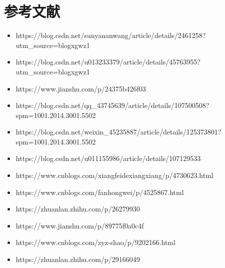 \documentclass[12pt, a4paper]{article}
\begin{document}
\section*{参考文献}
\begin{itemize}
    \item https://blog.csdn.net/sunyananwang/article/details/2461258?utm_source=blogxgwz1
    \item https://blog.csdn.net/u013233379/article/details/45763955?utm_source=blogxgwz1
    \item https://www.jianshu.com/p/24375b426f03
    \item https://blog.csdn.net/qq_43745639/article/details/107500508?spm=1001.2014.3001.5502
    \item https://blog.csdn.net/weixin_45235887/article/details/125373801?spm=1001.2014.3001.5502
    \item https://blog.csdn.net/u011155986/article/details/107129533
    \item https://www.cnblogs.com/xiangfeidexiangxiang/p/4730623.html
    \item https://www.cnblogs.com/fanhongwei/p/4525867.html
    \item https://zhuanlan.zhihu.com/p/26279930
    \item https://www.jianshu.com/p/89775f0a0c4f
    \item https://www.cnblogs.com/zyz-shao/p/9202166.html
    \item https://zhuanlan.zhihu.com/p/29166049
\end{itemize}
\end{document}
